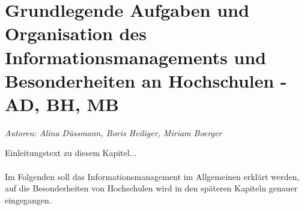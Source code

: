 \chapter{Grundlegende Aufgaben und Organisation des Informationsmanagements und Besonderheiten an Hochschulen - AD, BH, MB}
\label{chapter_grundlagen_INM}


\textit{Autoren: Alina Düssmann, Boris Heiliger, Miriam Boerger}

Einleitungstext zu diesem Kapitel...\\
\\
Im Folgenden soll das Informationsmanagement im Allgemeinen erklärt werden, auf die Besonderheiten von Hochschulen wird in den späteren Kapiteln genauer eingegangen.








